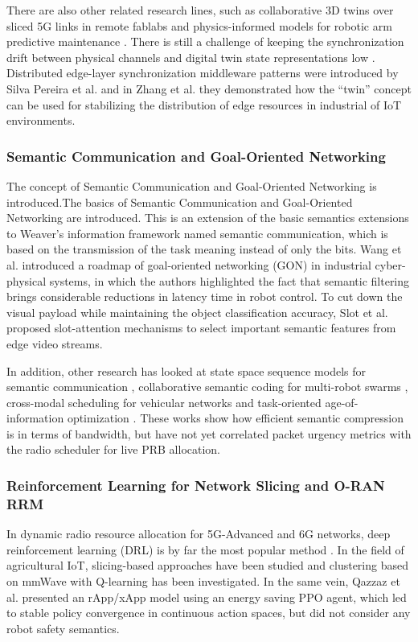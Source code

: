 \documentclass[twocolumn,10pt,twoside]{article}
\begin{document}
There are also other related research lines, such as collaborative 3D twins over sliced 5G links in remote fablabs \cite{fablab2026digital} and physics-informed models for robotic arm predictive maintenance \cite{robot2026physics}. There is still a challenge of keeping the synchronization drift between physical channels and digital twin state representations low \cite{survey2026comprehensive, hybrid2026digitaltwin}. Distributed edge-layer synchronization middleware patterns were introduced by Silva Pereira et al. \cite{pereira2026enabling} and in Zhang et al. \cite{zhang2022digitaltwin} they demonstrated how the ``twin'' concept can be used for stabilizing the distribution of edge resources in industrial of IoT environments.

\subsubsection{Semantic Communication and Goal-Oriented Networking}
The concept of Semantic Communication and Goal-Oriented Networking is introduced.The basics of Semantic Communication and Goal-Oriented Networking are introduced. This is an extension of the basic semantics extensions to Weaver's information framework \cite{popovski2020semantic, semantic2026generative} named semantic communication, which is based on the transmission of the task meaning instead of only the bits. Wang et al. \cite{wang2023semanticicps} introduced a roadmap of goal-oriented networking (GON) in industrial cyber-physical systems, in which the authors highlighted the fact that semantic filtering brings considerable reductions in latency time in robot control. To cut down the visual payload while maintaining the object classification accuracy, Slot et al. \cite{slot2026semantic} proposed slot-attention mechanisms to select important semantic features from edge video streams.

In addition, other research has looked at state space sequence models for semantic communication \cite{mamba2026semantic}, collaborative semantic coding for multi-robot swarms \cite{swarm2026semantic}, cross-modal scheduling for vehicular networks \cite{v2x2026semantic} and task-oriented age-of-information optimization \cite{aoi2026semantic}. These works show how efficient semantic compression is in terms of bandwidth, but have not yet correlated packet urgency metrics with the radio scheduler for live PRB allocation.

\subsubsection{Reinforcement Learning for Network Slicing and O-RAN RRM}
In dynamic radio resource allocation for 5G-Advanced and 6G networks, deep reinforcement learning (DRL) is by far the most popular method \cite{rrm2026survey, optim2026intelligent}. In the field of agricultural IoT, slicing-based approaches have been studied \cite{agri2025dynamic} and clustering based on mmWave with Q-learning \cite{mmwave2026kmeans} has been investigated. In the same vein, Qazzaz et al. \cite{qazzaz2026oreo} presented an rApp/xApp model using an energy saving PPO agent, which led to stable policy convergence in continuous action spaces, but did not consider any robot safety semantics.
\end{document}
